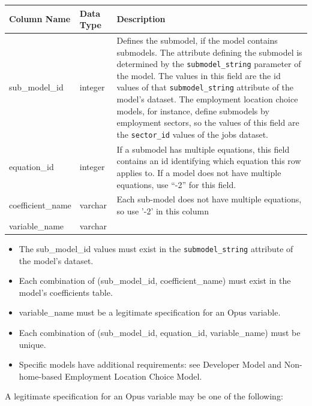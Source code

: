 \begin{tabular}{|l|l|p{4.5in}|}

\hline
\textbf{Column Name} & \textbf{Data Type} & \textbf{Description} \\

\hline sub_model_id & integer & Defines the submodel, if the model
contains submodels. The attribute defining the submodel is
determined by the \verb|submodel_string| parameter of the model. The
values in this field are the id values of that
\verb|submodel_string| attribute of the model's dataset. The
employment location choice models, for instance, define submodels by
employment sectors, so the values of this field are the
\verb|sector_id| values
of the jobs dataset. \\

\hline
equation_id & integer & If a submodel has multiple equations, this field
contains an id identifying which equation this row applies to.  If a model does
not have multiple equations, use ``-2'' for this field. \\

\hline
coefficient_name & varchar & Each sub-model does not have
multiple equations, so use '-2' in this column  \\

\hline
variable_name & varchar & \\

\hline

\end{tabular}

\begin{itemize} \tight
\item The sub_model_id values must exist in the \verb|submodel_string| attribute
of the model's dataset.
\item Each combination of (sub_model_id, coefficient_name)
must exist in the model's coefficients table.
\item variable_name must be a legitimate specification for an Opus variable.
\item Each combination of (sub_model_id, equation_id, variable_name) must be unique.
\item Specific models have additional requirements: see Developer Model and Non-home-based Employment Location Choice Model. 

\end{itemize}

A legitimate specification for an Opus variable may be one of the following:

